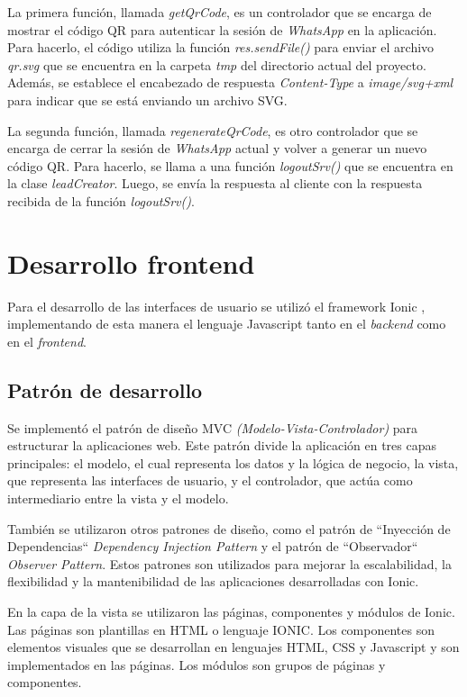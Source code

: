 La primera función, llamada \textit{getQrCode}, es un controlador que se encarga de mostrar el código QR para autenticar la sesión de \textit{WhatsApp} en la aplicación. Para hacerlo, el código utiliza la función \textit{res.sendFile()} para enviar el archivo \textit{qr.svg} que se encuentra en la carpeta \textit{tmp} del directorio actual del proyecto. Además, se establece el encabezado de respuesta \textit{Content-Type} a \textit{image/svg+xml} para indicar que se está enviando un archivo SVG.

La segunda función, llamada \textit{regenerateQrCode}, es otro controlador que se encarga de cerrar la sesión de \textit{WhatsApp} actual y volver a generar un nuevo código QR. Para hacerlo, se llama a una función \textit{logoutSrv()} que se encuentra en la clase \textit{leadCreator}. Luego, se envía la respuesta al cliente con la respuesta recibida de la función \textit{logoutSrv()}.


\section{Desarrollo frontend}
\label{sec:secarquitecturafrontend}
Para el desarrollo de las interfaces de usuario se utilizó el framework Ionic \cite{WEBSITE:ionic}, implementando de esta manera el lenguaje Javascript tanto en el \textit{backend} como en el \textit{frontend}.

\subsection{Patrón de desarrollo}
\label{subsec:frontpatron}

Se implementó el patrón de diseño MVC \citep{mvc} \textit{(Modelo-Vista-Controlador)} para estructurar la aplicaciones web. Este patrón divide la aplicación en tres capas principales: el modelo, el cual representa los datos y la lógica de negocio, la vista, que representa las interfaces de usuario, y el controlador, que actúa como intermediario entre la vista y el modelo.

También se utilizaron otros patrones de diseño, como el patrón de ``Inyección de Dependencias`` \citep{dependency-injection} \textit{Dependency Injection Pattern} y el patrón de ``Observador`` \citep{observer-pattern} \textit{Observer Pattern}. Estos patrones son utilizados para mejorar la escalabilidad, la flexibilidad y la mantenibilidad de las aplicaciones desarrolladas con Ionic.

En la capa de la vista se utilizaron las páginas, componentes y módulos de Ionic. Las páginas son plantillas en HTML o lenguaje IONIC. Los componentes son elementos visuales que se desarrollan en lenguajes HTML, CSS y Javascript y son implementados en las páginas. Los módulos son grupos de páginas y componentes. 

